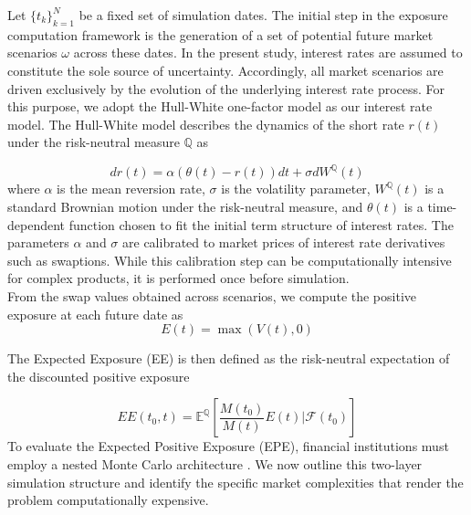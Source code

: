     \noindent
    Let $\{t_k\}_{k=1}^{N}$ be a fixed set of simulation dates. The initial step in the exposure computation framework is the generation of a set of potential future market scenarios $\omega$ across these dates. In the present study, interest rates are assumed to constitute the sole source of uncertainty. Accordingly, all market scenarios are driven exclusively by the evolution of the underlying interest rate process. For this purpose, we adopt the Hull-White one-factor model as our interest rate model. The Hull-White model describes the dynamics of the short rate $r(t)$ under the risk-neutral measure $\mathbb{Q}$ as
    
    \begin{equation}\label{eq:hull_white}
        dr(t) = \alpha(\theta(t) -  r(t))dt + \sigma dW^\mathbb{Q}(t)
    \end{equation}
    \noindent
    where $\alpha$ is the mean reversion rate, $\sigma$ is the volatility parameter, $W^\mathbb{Q}(t)$ is a standard Brownian motion under the risk-neutral measure, and $\theta(t)$ is a time-dependent function chosen to fit the initial term structure of interest rates. The parameters $\alpha$ and $\sigma$ are calibrated to market prices of interest rate derivatives such as swaptions. While this calibration step can be computationally intensive for complex products, it is performed once before simulation. \\
    
    \noindent 
    From the swap values obtained across scenarios, we compute the positive exposure at each future date as
    \begin{equation}
    E(t) = \max(V(t), 0)
    \label{eq:positive_exposure}
    \end{equation}
    
    \noindent
    The Expected Exposure (EE) is then defined as the risk-neutral expectation of the discounted positive exposure
    
    \begin{equation}
    EE(t_0,t) = \mathbb{E} ^\mathbb{Q} \left[ \frac{M(t_0)}{M(t)} E(t) \Big| \mathscr{F}(t_0) \right]
    \label{eq:ee}
    \end{equation}
    \noindent
    To evaluate the Expected Positive Exposure (EPE), financial institutions must employ a nested Monte Carlo architecture \cite{Gregory_2015}. We now outline this two-layer simulation structure and identify the specific market complexities that render the problem computationally expensive.\\

